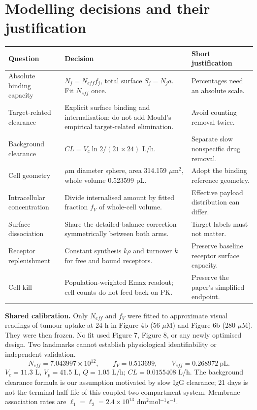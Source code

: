 \documentclass[10pt,a4paper]{article}
\begin{document}
\section*{Modelling decisions and their justification}
\begin{tabular}{>{\raggedright\arraybackslash}p{.25\linewidth}>{\raggedright\arraybackslash}p{.45\linewidth}>{\raggedright\arraybackslash}p{.20\linewidth}}\toprule
Question & Decision & Short justification\\\midrule
Absolute binding capacity & $N_j=N_{eff}f_j$, total surface $S_j=N_ja$. Fit $N_{eff}$ once. & Percentages need an absolute scale.\\
Target-related clearance & Explicit surface binding and internalisation; do not add Mould's empirical target-related elimination. & Avoid counting removal twice.\\
Background clearance & $CL=V_c\ln 2/(21\times24)$ L/h. & Separate slow nonspecific drug removal.\\
Cell geometry & 10 $\mu$m diameter sphere, area 314.159 $\mu$m$^2$, whole volume 0.523599 pL. & Adopt the binding reference geometry.\\
Intracellular concentration & Divide internalised amount by fitted fraction $f_V$ of whole-cell volume. & Effective payload distribution can differ.\\
Surface dissociation & Share the detailed-balance correction symmetrically between both arms. & Target labels must not matter.\\
Receptor replenishment & Constant synthesis $k\rho$ and turnover $k$ for free and bound receptors. & Preserve baseline receptor surface capacity.\\
Cell kill & Population-weighted Emax readout; cell counts do not feed back on PK. & Preserve the paper's simplified endpoint.\\\bottomrule
\end{tabular}

\textbf{Shared calibration.} Only $N_{eff}$ and $f_V$ were fitted to approximate visual readings of tumour uptake at 24 h in Figure 4b (56 $\mu$M) and Figure 6b (280 $\mu$M). They were then frozen. No fit used Figure 7, Figure 8, or any newly optimised design. Two landmarks cannot establish physiological identifiability or independent validation.
\[
N_{eff}=7.043997\times10^{12},\qquad f_V=0.513699,\qquad V_{eff}=0.268972\ \mathrm{pL}.
\]
$V_c=11.3$ L, $V_p=41.5$ L, $Q=1.05$ L/h; $CL=0.0155408$ L/h. The background clearance formula is our assumption motivated by slow IgG clearance; 21 days is not the terminal half-life of this coupled two-compartment system. Membrane association rates are $\ell_1=\ell_2=2.4\times10^{13}$ dm$^2$mol$^{-1}$s$^{-1}$.
\end{document}
